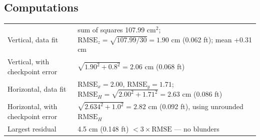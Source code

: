 \subsection*{Computations}
\begin{center}\small
\renewcommand{\arraystretch}{1.25}
\begin{tabularx}{\linewidth}{>{\raggedright\arraybackslash}p{5.2cm}X}\toprule
Vertical, data fit & sum of squares 107.99 cm$^2$; $\text{RMSE}_z=\sqrt{107.99/30}=1.90$ cm (0.062 ft); mean +0.31 cm\\
Vertical, with checkpoint error & $\sqrt{1.90^2+0.8^2}=2.06$ cm (0.068 ft)\\
Horizontal, data fit & $\text{RMSE}_x=2.00$, $\text{RMSE}_y=1.71$; $\text{RMSE}_H=\sqrt{2.00^2+1.71^2}=2.63$ cm (0.086 ft)\\
Horizontal, with checkpoint error & $\sqrt{2.634^2+1.0^2}=2.82$ cm (0.092 ft), using unrounded $\text{RMSE}_H$\\
Largest residual & 4.5 cm (0.148 ft) $<3\times\text{RMSE}$ --- no blunders\\\bottomrule
\end{tabularx}\end{center}

